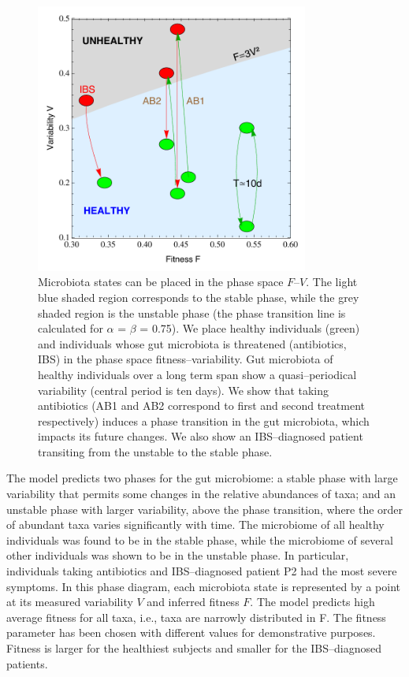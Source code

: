 \begin{figure}
	\centering
	\vspace*{-5mm} %
	\includegraphics[width=0.8\textwidth]{results/finalPlot33_new.pdf}
	\caption{Microbiota states can be placed in the phase space $F$--$V$. The light blue shaded region corresponds to the stable phase, while the grey shaded region is the unstable phase (the phase transition line is calculated for  $\alpha$ = $\beta$ = 0.75). We place healthy individuals (green) and individuals whose gut microbiota is threatened (antibiotics, IBS) in the phase space fitness--variability. Gut microbiota of healthy individuals over a long term span show a quasi--periodical variability (central period is ten days). We show that taking antibiotics (AB1 and AB2 correspond to first and second treatment respectively) induces a phase transition in the gut microbiota, which impacts its future changes. We also show an IBS--diagnosed patient transiting from the unstable to the stable phase.}
	\label{fig:main3}
\end{figure}

The model predicts two phases for the gut microbiome: a stable phase with large variability that permits some changes in the relative abundances of taxa; and an unstable phase with larger variability, above the phase transition, where the order of abundant taxa varies significantly with time. The microbiome of all healthy individuals was found to be in the stable phase, while the microbiome of several other individuals was shown to be in the unstable phase. In particular, individuals taking antibiotics and IBS--diagnosed patient P2 had the most severe symptoms. In this phase diagram, each microbiota state is represented by a point at its measured variability $V$ and inferred fitness $F$. The model predicts high average fitness for all taxa, i.e., taxa are narrowly distributed in F. The fitness parameter has been chosen with different values for demonstrative purposes. Fitness is larger for the healthiest subjects and smaller for the IBS--diagnosed patients.

